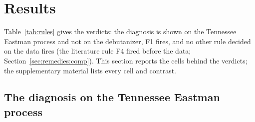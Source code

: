 \section{Results}\label{sec:results}

Table~\ref{tab:rules} gives the verdicts: the diagnosis is shown on the Tennessee Eastman process
and not on the debutanizer, F1 fires, and no other rule decided on the data fires (the literature
rule F4 fired before the data; Section~\ref{sec:remedies:comp}). This section reports the cells
behind the verdicts; the supplementary material lists every cell and contrast.

\begin{table}[t]
\centering\footnotesize
\caption{Seven cells at T1, $\theta = 4$: means over the 15 runs. Loop off: split conformal,
calibrated once. Median width: the run median of the finite interval widths, in mol\,\%; worst
rolling coverage: the minimum over 100 consecutive intervals; sd($\alpha$): the standard deviation
of the level; IACT of the misses. Last rows: the paired difference, compensated minus
uncompensated, under replay to $\varepsilon/2$, with its 95\,\% $t$ interval (coverages as
fractions).}
\label{tab:t1cells}

\end{table}

\begin{table}[t]
\centering\footnotesize
\caption{The compensated loop (replay to $\varepsilon/2$) against four baseline configurations at
T1, $\theta = 4$: means over the 15 runs. Valid: mean $U$ at most 2\,\% and mean coverage within
2 points of 0.90. F7 width: the run median over all issued intervals, infinite ones included,
in mol\,\%.
Coverage-matched width change: each run's baseline width scaled to the loop's coverage in that run
by the ratio of Gaussian quantiles, against the loop's width; in brackets, the runs in which the
baseline is narrower. F7 fires if a valid baseline is at least 5\,\% narrower on average and
narrower in at least 12 of the 15 runs.}
\label{tab:baselines}

\end{table}

\subsection{The diagnosis on the Tennessee Eastman process}\label{sec:results:diagnosis}

